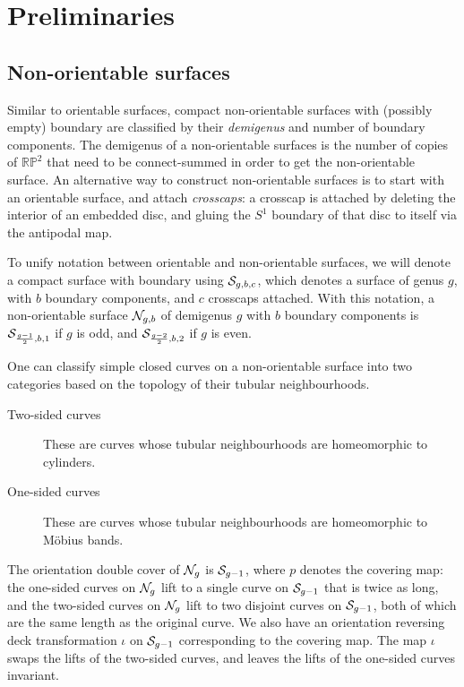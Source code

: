 \section{Preliminaries}
\label{sec:preliminaries}

\subsection{Non-orientable surfaces}
\label{sec:non-orient-surf}

Similar to orientable surfaces, compact non-orientable surfaces with (possibly empty) boundary are classified by their \emph{demigenus} and number of boundary components.
The demigenus of a non-orientable surfaces is the number of copies of $\mathbb{RP}^2$ that need to be connect-summed in order to get the non-orientable surface.
An alternative way to construct non-orientable surfaces is to start with an orientable surface, and attach \emph{crosscaps}: a crosscap is attached by deleting the interior of an embedded disc, and gluing the $S^1$ boundary of that disc to itself via the antipodal map.

To unify notation between orientable and non-orientable surfaces, we will denote a compact surface with boundary using $\mathcal{S}_{g,b,c}$, which denotes a surface of genus $g$, with $b$ boundary components, and $c$ crosscaps attached.
With this notation, a non-orientable surface $\mathcal{N}_{g, b}$ of demigenus $g$ with $b$ boundary components is $\mathcal{S}_{\frac{g-1}{2}, b, 1}$ if $g$ is odd, and $\mathcal{S}_{\frac{g-2}{2}, b, 2}$ if $g$ is even.

One can classify simple closed curves on a non-orientable surface into two categories based on the topology of their tubular neighbourhoods.
\begin{description}
\item[Two-sided curves] These are curves whose tubular neighbourhoods are homeomorphic to cylinders.
\item[One-sided curves] These are curves whose tubular neighbourhoods are homeomorphic to Möbius bands.
\end{description}

The orientation double cover of $\mathcal{N}_g$ is $\mathcal{S}_{g-1}$, where $p$ denotes the covering map: the one-sided curves on $\mathcal{N}_g$ lift to a single curve on $\mathcal{S}_{g-1}$ that is twice as long, and the two-sided curves on $\mathcal{N}_g$ lift to two disjoint curves on $\mathcal{S}_{g-1}$, both of which are the same length as the original curve.
We also have an orientation reversing deck transformation $\iota$ on $\mathcal{S}_{g-1}$ corresponding to the covering map.
The map $\iota$ swaps the lifts of the two-sided curves, and leaves the lifts of the one-sided curves invariant.

